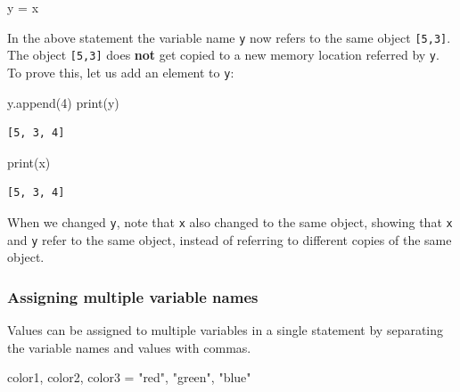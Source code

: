 \documentclass[
  letterpaper,
  DIV=11,
  numbers=noendperiod]{scrreprt}
\newenvironment{Shaded}{\begin{snugshade}}{\end{snugshade}}
\newcommand{\BuiltInTok}[1]{\textcolor[rgb]{0.00,0.23,0.31}{#1}}
\newcommand{\DecValTok}[1]{\textcolor[rgb]{0.68,0.00,0.00}{#1}}
\newcommand{\NormalTok}[1]{\textcolor[rgb]{0.00,0.23,0.31}{#1}}
\newcommand{\OperatorTok}[1]{\textcolor[rgb]{0.37,0.37,0.37}{#1}}
\newcommand{\StringTok}[1]{\textcolor[rgb]{0.13,0.47,0.30}{#1}}
\begin{document}
\begin{Shaded}
\begin{Highlighting}[]
\NormalTok{y }\OperatorTok{=}\NormalTok{ x}
\end{Highlighting}
\end{Shaded}

In the above statement the variable name \texttt{y} now refers to the
same object \texttt{{[}5,3{]}}. The object \texttt{{[}5,3{]}} does
\textbf{not} get copied to a new memory location referred by \texttt{y}.
To prove this, let us add an element to \texttt{y}:

\begin{Shaded}
\begin{Highlighting}[]
\NormalTok{y.append(}\DecValTok{4}\NormalTok{)}
\BuiltInTok{print}\NormalTok{(y)}
\end{Highlighting}
\end{Shaded}

\begin{verbatim}
[5, 3, 4]
\end{verbatim}

\begin{Shaded}
\begin{Highlighting}[]
\BuiltInTok{print}\NormalTok{(x)}
\end{Highlighting}
\end{Shaded}

\begin{verbatim}
[5, 3, 4]
\end{verbatim}

When we changed \texttt{y}, note that \texttt{x} also changed to the
same object, showing that \texttt{x} and \texttt{y} refer to the same
object, instead of referring to different copies of the same object.

\hypertarget{assigning-multiple-variable-names}{%
\subsubsection{Assigning multiple variable
names}\label{assigning-multiple-variable-names}}

Values can be assigned to multiple variables in a single statement by
separating the variable names and values with commas.

\begin{Shaded}
\begin{Highlighting}[]
\NormalTok{color1, color2, color3 }\OperatorTok{=} \StringTok{"red"}\NormalTok{, }\StringTok{"green"}\NormalTok{, }\StringTok{"blue"}
\end{Highlighting}
\end{Shaded}
\end{document}
